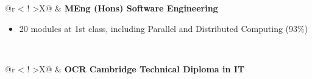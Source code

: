 

\begin{table}[H]
    \renewcommand\arraystretch{1.4}
    \begin{tabularx}{\textwidth}{@{}r <{\hskip -3pt} !{\foo} >{}X@{}}
        \addlinespace[1.5ex]
        & \textbf{MEng (Hons) Software Engineering} \hfill {}
        \parbox{\textwidth}{}
        \begin{itemize}[topsep=5pt]
            \item 20 modules at 1st class, including Parallel and Distributed Computing (93\%)
        \end{itemize} \\
    \end{tabularx}
\end{table}
\vspace{-1.2em}

\begin{table}[H]
    \renewcommand\arraystretch{1.4}
    \begin{tabularx}{\textwidth}{@{}r <{\hskip -3pt} !{\foo} >{}X@{}}
        \addlinespace[1.5ex]
        & \textbf{OCR Cambridge Technical Diploma in IT} \hfill {}
        \parbox{\textwidth}{}
    \end{tabularx}
\end{table}
\vspace{-1.2em}
